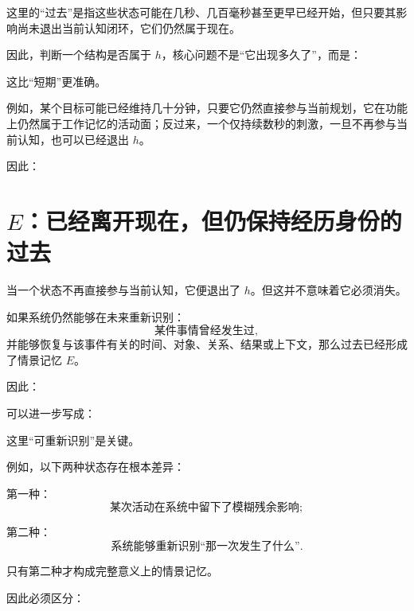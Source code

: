 这里的“过去”是指这些状态可能在几秒、几百毫秒甚至更早已经开始，但只要其影响尚未退出当前认知闭环，它们仍然属于现在。

因此，判断一个结构是否属于 $h$，核心问题不是“它出现多久了”，而是：
\begin{statementbox}
\centering
{}
\end{statementbox}

这比“短期”更准确。

例如，某个目标可能已经维持几十分钟，只要它仍然直接参与当前规划，它在功能上仍然属于工作记忆的活动面；反过来，一个仅持续数秒的刺激，一旦不再参与当前认知，也可以已经退出 $h$。

因此：
\begin{statementbox}
\centering
{}
\end{statementbox}

\section{$E$：已经离开现在，但仍保持经历身份的过去}

当一个状态不再直接参与当前认知，它便退出了 $h$。但这并不意味着它必须消失。

如果系统仍然能够在未来重新识别：
\[
\text{某件事情曾经发生过},
\]
并能够恢复与该事件有关的时间、对象、关系、结果或上下文，那么过去已经形成了情景记忆 $E$。

因此：
\begin{statementbox}
\centering
{}
\end{statementbox}

可以进一步写成：
\begin{statementbox}
\centering
{}
\end{statementbox}

这里“可重新识别”是关键。

例如，以下两种状态存在根本差异：

第一种：
\[
\text{某次活动在系统中留下了模糊残余影响};
\]

第二种：
\[
\text{系统能够重新识别“那一次发生了什么”}.
\]

只有第二种才构成完整意义上的情景记忆。

因此必须区分：
\begin{statementbox}
\centering
{}
\end{statementbox}

